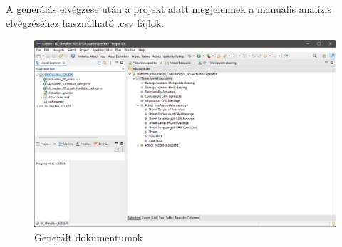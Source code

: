 A generálás elvégzése után a projekt alatt megjelennek a manuális analízis elvégzéséhez használható .csv fájlok.

\begin{figure}[!ht]
	\centering
	\includegraphics[width=130mm, keepaspectratio]{figures/05_docgen_2.png}
	\caption{Generált dokumentumok}
\end{figure}
